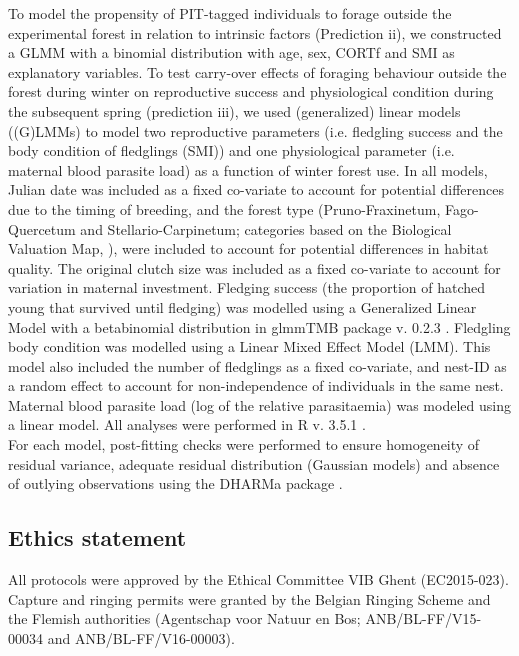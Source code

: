 \documentclass[10pt, twoside]{book} %
\begin{document}
To model the propensity of PIT-tagged individuals to forage outside the experimental forest in relation to intrinsic factors (Prediction ii), we constructed a GLMM with a binomial distribution with age, sex, CORTf and SMI as explanatory variables. To test carry-over effects of foraging behaviour outside the forest during winter on reproductive success and physiological condition during the subsequent spring (prediction iii), we used (generalized) linear models ((G)LMMs) to model two reproductive parameters (i.e. fledgling success and the body condition of fledglings (SMI)) and one physiological parameter (i.e. maternal blood parasite load) as a function of winter forest use. In all models, Julian date was included as a fixed co-variate to account for potential differences due to the timing of breeding, and the forest type (Pruno-Fraxinetum, Fago-Quercetum and Stellario-Carpinetum; categories based on the Biological Valuation Map, \citealt{Vriens2011}), were included to account for potential differences in habitat quality. The original clutch size was included as a fixed co-variate to account for variation in maternal investment. Fledging success (the proportion of hatched young that survived until fledging) was modelled using a Generalized Linear Model with a betabinomial distribution in glmmTMB package v. 0.2.3 \citep{Brooks2017}. Fledgling body condition was modelled using a Linear Mixed Effect Model (LMM). This model also included the number of fledglings as a fixed co-variate, and nest-ID as a random effect to account for non-independence of individuals in the same nest. Maternal blood parasite load (log of the relative parasitaemia) was modeled using a linear model. All analyses were performed in R v. 3.5.1 \citep{RCoreTeam2018}.\\

For each model, post-fitting checks were performed to ensure homogeneity of residual variance, adequate residual distribution (Gaussian models) and absence of outlying observations using the DHARMa package \citep{Hartig2019}. 
	

	\subsection*{Ethics statement}

All protocols were approved by the Ethical Committee VIB Ghent (EC2015-023). Capture and ringing permits were granted by the Belgian Ringing Scheme and the Flemish authorities (Agentschap voor Natuur en Bos; ANB/BL-FF/V15-00034 and ANB/BL-FF/V16-00003).\\
\end{document}

